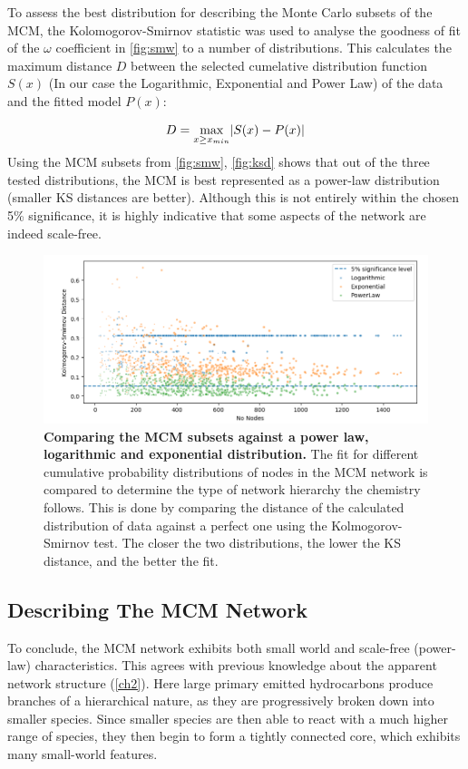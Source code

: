 To assess the best distribution for describing the Monte Carlo subsets of the MCM, the Kolomogorov-Smirnov statistic \citep{ks} was used to analyse the goodness of fit of the $\omega$ coefficient in \autoref{fig:smw} to a number of distributions. This calculates the maximum distance $D$ between the selected cumelative distribution function $S(x)$ (In our case the Logarithmic, Exponential and Power Law) of the data and the fitted model $P(x)$:

\begin{equation}
D = \smash{\displaystyle\max_{x \ge x_{min}}} |{S(x) - P(x)}|
\end{equation}

Using the MCM subsets from \autoref{fig:smw}, \autoref{fig:ksd} shows that out of the three tested distributions, the MCM is best represented as a power-law distribution (smaller KS distances are better). Although this is not entirely within the chosen 5\% significance, it is highly indicative that some aspects of the network are indeed scale-free.

\begin{figure}[H]
     \centering
         \includegraphics[width=\textwidth]{figures_c3/KSdistance.png}
        \caption{\textbf{Comparing the MCM subsets against a power law, logarithmic and exponential distribution.} The fit for different cumulative probability distributions of nodes in the MCM network is compared to determine the type of network hierarchy the chemistry follows. This is done by comparing the distance of the calculated distribution of data against a perfect one using the Kolmogorov-Smirnov test. The closer the two distributions, the lower the KS distance, and the better the fit. }
        \label{fig:ksd}
\end{figure}

\subsection{Describing The MCM Network}
To conclude, the MCM network exhibits both small world and scale-free (power-law) characteristics. This agrees with previous knowledge about the apparent network structure (\autoref{ch2}). Here large primary emitted hydrocarbons produce branches of a hierarchical nature, as they are progressively broken down into smaller species. Since smaller species are then able to react with a much higher range of species, they then begin to form a tightly connected core, which exhibits many small-world features.

